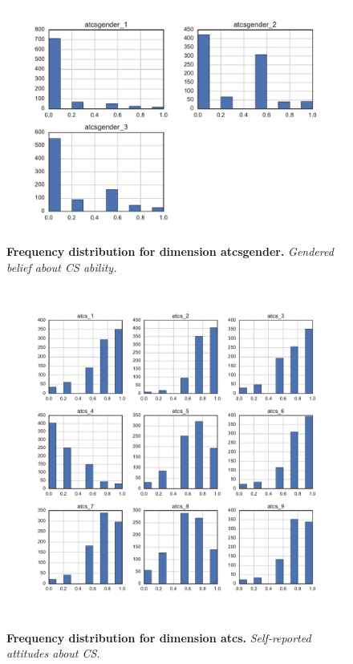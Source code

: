 \begin{figure}[!hbtp]
\centering
    \caption{\textbf{Frequency distribution for dimension atcsgender. }\textit{Gendered belief about CS ability.}}\label{atcsgender_dimension}
    \includegraphics[width=1\textwidth]{figures/atcsgender_dimension}
\end{figure}

\begin{figure}[!hbtp]
\centering
    \caption{\textbf{Frequency distribution for dimension atcs. }\textit{Self-reported attitudes about CS.}}\label{atcs_dimension}
    \includegraphics[width=1\textwidth]{figures/atcs_dimension}
\end{figure}

